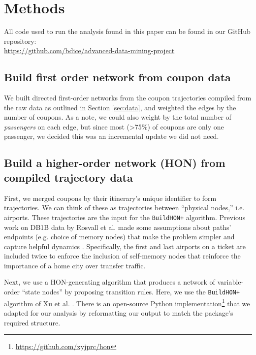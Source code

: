 \documentclass[sigconf]{acmart}
\begin{document}
\section{Methods} \label{sec:methods}

All code used to run the analysis found in this paper can be found in our GitHub repository: \\ \url{https://github.com/bdice/advanced-data-mining-project}

\subsection{Build first order network from coupon data}
We built directed first-order networks from the coupon trajectories compiled from the raw data as outlined in Section \ref{sec:data}, and weighted the edges by the number of coupons. As a note, we could also weight by the total number of \textit{passengers} on each edge, but since most (>75\%) of coupons are only one passenger, we decided this was an incremental update we did not need.

\subsection{Build a higher-order network (HON) from compiled trajectory data}
First, we merged coupons by their itinerary's unique identifier to form trajectories. We can think of these as trajectories between ``physical nodes,'' i.e. airports.  These trajectories are the input for the \texttt{BuildHON+} algorithm. Previous work on DB1B data by Rosvall et al. made some assumptions about paths' endpoints (e.g. choice of memory nodes) that make the problem simpler and capture helpful dynamics \cite{Rosvall2014}. Specifically, the first and last airports on a ticket are included twice to enforce the inclusion of self-memory nodes that reinforce the importance of a home city over transfer traffic. 

Next, we use a HON-generating algorithm that produces a network of variable-order ``state nodes'' by proposing transition rules. Here, we use the \texttt{BuildHON+} algorithm of Xu et al. \cite{Xu2017}. There is an open-source Python implementation\footnote{\url{https://github.com/xyjprc/hon}} that we adapted for our analysis by reformatting our output to match the package's required structure\cite{Xu2016,Xu2017}.
\end{document}
